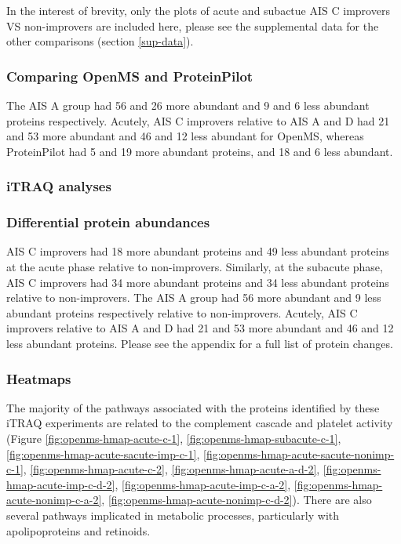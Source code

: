 \documentclass[9pt,lineno]{elife}
\begin{document}
In the interest of brevity, only the plots of acute and subactue AIS C improvers VS non-improvers are included here, please see the supplemental data for the other comparisons (section \ref{sup-data}).

\hypertarget{comparing-openms-and-proteinpilot}{%
\subsubsection{Comparing OpenMS and ProteinPilot}\label{comparing-openms-and-proteinpilot}}

The AIS A group had 56 and 26 more abundant and 9 and 6 less abundant proteins respectively.
Acutely, AIS C improvers relative to AIS A and D had 21 and 53 more abundant and 46 and 12 less abundant for OpenMS, whereas ProteinPilot had 5 and 19 more abundant proteins, and 18 and 6 less abundant.





\clearpage

\hypertarget{itraq-analyses}{%
\subsubsection{iTRAQ analyses}\label{itraq-analyses}}

\hypertarget{differential-protein-abundances}{%
\subsubsection{Differential protein abundances}\label{differential-protein-abundances}}

AIS C improvers had 18 more abundant proteins and 49 less abundant proteins at the acute phase relative to non-improvers.
Similarly, at the subacute phase, AIS C improvers had 34 more abundant proteins and 34 less abundant proteins relative to non-improvers.
The AIS A group had 56 more abundant and 9 less abundant proteins respectively relative to non-improvers.
Acutely, AIS C improvers relative to AIS A and D had 21 and 53 more abundant and 46 and 12 less abundant proteins.
Please see the appendix for a full list of protein changes.

\hypertarget{heatmaps-chap3}{%
\subsubsection{Heatmaps}\label{heatmaps-chap3}}

The majority of the pathways associated with the proteins identified by these iTRAQ experiments are related to the complement cascade and platelet activity (Figure \ref{fig:openms-hmap-acute-c-1}, \ref{fig:openms-hmap-subacute-c-1}, \ref{fig:openms-hmap-acute-sacute-imp-c-1}, \ref{fig:openms-hmap-acute-sacute-nonimp-c-1}, \ref{fig:openms-hmap-acute-c-2}, \ref{fig:openms-hmap-acute-a-d-2}, \ref{fig:openms-hmap-acute-imp-c-d-2}, \ref{fig:openms-hmap-acute-imp-c-a-2}, \ref{fig:openms-hmap-acute-nonimp-c-a-2}, \ref{fig:openms-hmap-acute-nonimp-c-d-2}).
There are also several pathways implicated in metabolic processes, particularly with apolipoproteins and retinoids.
\end{document}
